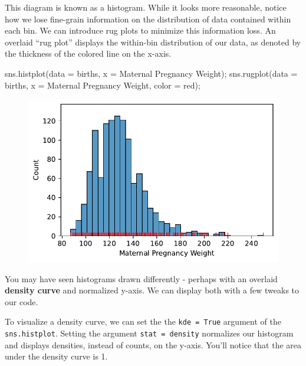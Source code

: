 \documentclass[
  letterpaper,
  DIV=11,
  numbers=noendperiod]{scrreprt}
\newenvironment{Shaded}{\begin{snugshade}}{\end{snugshade}}
\newcommand{\NormalTok}[1]{\textcolor[rgb]{0.00,0.23,0.31}{#1}}
\newcommand{\OperatorTok}[1]{\textcolor[rgb]{0.37,0.37,0.37}{#1}}
\newcommand{\StringTok}[1]{\textcolor[rgb]{0.13,0.47,0.30}{#1}}
\begin{document}
This diagram is known as a histogram. While it looks more reasonable,
notice how we lose fine-grain information on the distribution of data
contained within each bin. We can introduce rug plots to minimize this
information loss. An overlaid ``rug plot'' displays the within-bin
distribution of our data, as denoted by the thickness of the colored
line on the x-axis.

\begin{Shaded}
\begin{Highlighting}[]
\NormalTok{sns.histplot(data }\OperatorTok{=}\NormalTok{ births, x }\OperatorTok{=} \StringTok{\textquotesingle{}Maternal Pregnancy Weight\textquotesingle{}}\NormalTok{)}\OperatorTok{;}
\NormalTok{sns.rugplot(data }\OperatorTok{=}\NormalTok{ births, x }\OperatorTok{=} \StringTok{\textquotesingle{}Maternal Pregnancy Weight\textquotesingle{}}\NormalTok{, color }\OperatorTok{=} \StringTok{\textquotesingle{}red\textquotesingle{}}\NormalTok{)}\OperatorTok{;}
\end{Highlighting}
\end{Shaded}

\begin{figure}[H]

{\centering \includegraphics{visualization_1/visualization_1_files/figure-pdf/cell-9-output-1.pdf}

}

\end{figure}

You may have seen histograms drawn differently - perhaps with an
overlaid \textbf{density curve} and normalized y-axis. We can display
both with a few tweaks to our code.

To visualize a density curve, we can set the the \texttt{kde\ =\ True}
argument of the \texttt{sns.histplot}. Setting the argument
\texttt{stat\ =\ \textquotesingle{}density\textquotesingle{}} normalizes
our histogram and displays densities, instead of counts, on the y-axis.
You'll notice that the area under the density curve is 1.
\end{document}

